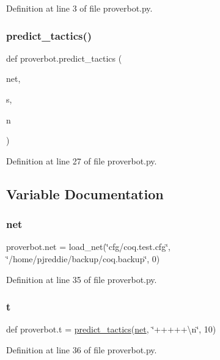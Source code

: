 Definition at line 3 of file proverbot.\+py.

\mbox{\label{namespaceproverbot_ab0692d97bc0c5fb3229d3ab3b0f5d0e3}} 
\subsubsection{\texorpdfstring{predict\_tactics()}{predict\_tactics()}}
{\footnotesize\ttfamily def proverbot.\+predict\+\_\+tactics (\begin{DoxyParamCaption}\item[{}]{net,  }\item[{}]{s,  }\item[{}]{n }\end{DoxyParamCaption})}



Definition at line 27 of file proverbot.\+py.



\subsection{Variable Documentation}
\mbox{\label{namespaceproverbot_a76d62031ec897d73169a3dd75791259a}} 
\subsubsection{\texorpdfstring{net}{net}}
{\footnotesize\ttfamily proverbot.\+net = load\+\_\+net(\char`\"{}cfg/coq.\+test.\+cfg\char`\"{}, \char`\"{}/home/pjreddie/backup/coq.\+backup\char`\"{}, 0)}



Definition at line 35 of file proverbot.\+py.

\mbox{\label{namespaceproverbot_aeda027db8b7d08f176f7192ec62bfbf2}} 
\subsubsection{\texorpdfstring{t}{t}}
{\footnotesize\ttfamily def proverbot.\+t = \mbox{\hyperlink{namespaceproverbot_ab0692d97bc0c5fb3229d3ab3b0f5d0e3}{predict\+\_\+tactics}}(\mbox{\hyperlink{namespaceproverbot_a76d62031ec897d73169a3dd75791259a}{net}}, \char`\"{}+++++\textbackslash{}n\char`\"{}, 10)}



Definition at line 36 of file proverbot.\+py.

